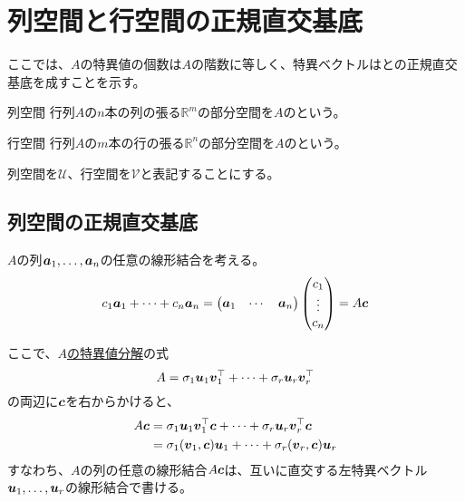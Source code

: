 \documentclass[../../../topic_linear-algebra]{subfiles}
\begin{document}
\sectionline
\section{列空間と行空間の正規直交基底}

ここでは、$A$の特異値の個数は$A$の階数に等しく、特異ベクトルはとの正規直交基底を成すことを示す。

\begin{definition*}{列空間}
  行列$A$の$n$本の列の張る$\mathbb{R}^m$の部分空間を$A$のという。
\end{definition*}

\begin{definition*}{行空間}
  行列$A$の$m$本の行の張る$\mathbb{R}^n$の部分空間を$A$のという。
\end{definition*}

列空間を$\mathcal{U}$、行空間を$\mathcal{V}$と表記することにする。

\subsection{列空間の正規直交基底}

$A$の列$\vb*{a}_1,\ldots,\vb*{a}_n$の任意の線形結合を考える。
\begin{equation*}
  c_1 \vb*{a}_1 + \cdots + c_n \vb*{a}_n = \begin{pmatrix}
    \vb*{a}_1 & \cdots & \vb*{a}_n
  \end{pmatrix} \begin{pmatrix}
    c_1    \\
    \vdots \\
    c_n
  \end{pmatrix} = A \vb*{c}
\end{equation*}

ここで、\hyperref[sec:svd-of-A]{$A$の特異値分解}の式
\begin{equation*}
  A = \sigma_1\vb*{u}_1\vb*{v}_1^\top + \cdots + \sigma_r \vb*{u}_r \vb*{v}_r^\top
\end{equation*}
の両辺に$\vb*{c}$を右からかけると、
\begin{align*}
  A \vb*{c} & = \sigma_1\vb*{u}_1\vb*{v}_1^\top \vb*{c} + \cdots + \sigma_r \vb*{u}_r \vb*{v}_r^\top \vb*{c} \\
            & = \sigma_1 (\vb*{v}_1, \vb*{c}) \vb*{u}_1 + \cdots + \sigma_r (\vb*{v}_r, \vb*{c}) \vb*{u}_r
\end{align*}
すなわち、$A$の列の任意の線形結合$A\vb*{c}$は、互いに直交する左特異ベクトル$\vb*{u}_1,\ldots,\vb*{u}_r$の線形結合で書ける。
\end{document}
